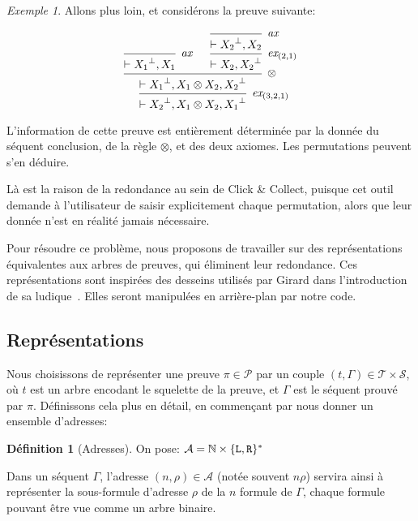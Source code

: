 \documentclass[11pt,a4paper]{article}
\theoremstyle{plain}
\theoremstyle{definition}
\newtheorem{definition}{Définition}
\theoremstyle{remark}
\newtheorem{example}{Exemple}
\newcommand*{\orth}{^\perp}
\newcommand*{\tensor}{\otimes}
\newcommand*{\axv}[1]{\infer{0}[\ensuremath{\mathit{ax}}]{\vdash #1}}
\newcommand*{\tensorv}[1]{\infer{2}[\ensuremath{\tensor}]{\vdash #1}}
\newcommand*{\permv}[2]{\infer{1}[\ensuremath{\textit{ex}_{#1}}]{\vdash #2}}
\newcommand*{\someproof}{\pi}
\newcommand*{\sequent}{\Gamma}
\newcommand*{\Left}{\textnormal{\texttt{L}}}
\newcommand*{\Right}{\textnormal{\texttt{R}}}
\newcommand*{\sequents}{\ensuremath{\mathcal{S}}}
\newcommand*{\trees}{\ensuremath{\mathcal{T}}}
\newcommand*{\representationslarge}{\ensuremath{\trees \times \sequents}}
\begin{document}
\begin{example}
    Allons plus loin, et considérons la preuve suivante:

    \begin{equation*}
        \begin{prooftree}
            \axv{{X_1}\orth, X_1}
            \axv{{X_2}\orth, X_2}
            \permv{(2, 1)}{X_2, {X_2}\orth}
            \tensorv{{X_1}\orth, X_1 \tensor X_2, {X_2}\orth}
            \permv{(3, 2, 1)}{{X_2}\orth, X_1 \tensor X_2, {X_1}\orth}
        \end{prooftree}
    \end{equation*}
    

    L'information de cette preuve est entièrement déterminée par la donnée du séquent conclusion, de la règle $\tensor$, et des deux axiomes. Les permutations peuvent s'en déduire.
\end{example}

Là est la raison de la redondance au sein de Click \& Collect, puisque cet outil demande à l'utilisateur de saisir explicitement chaque permutation, alors que leur donnée n'est en réalité jamais nécessaire.

Pour résoudre ce problème, nous proposons de travailler sur des représentations équivalentes aux arbres de preuves, qui éliminent leur redondance. Ces représentations sont inspirées des desseins utilisés par Girard dans l'introduction de sa ludique~\cite{locus}. Elles seront manipulées en arrière-plan par notre code.

\subsection{Représentations}
Nous choisissons de représenter une preuve $\someproof \in \mathcal{P}$ par un couple $(t, \sequent) \in \representationslarge$, où $t$ est un arbre encodant le squelette de la preuve, et $\sequent$ est le séquent prouvé par $\someproof$. Définissons cela plus en détail, en commençant par nous donner un ensemble d'adresses:

\begin{definition}[Adresses]
On pose:
\quad $\mathcal{A} = \mathbb{N} \times \{ \Left, \Right\}^{*}$

Dans un séquent $\sequent$, l'adresse $(n, \rho) \in \mathcal{A}$ (notée souvent $n \rho$) servira ainsi à représenter la sous-formule d'adresse $\rho$ de la $n$\ieme{} formule de $\sequent$, chaque formule pouvant être vue comme un arbre binaire.
\end{definition}
\end{document}
